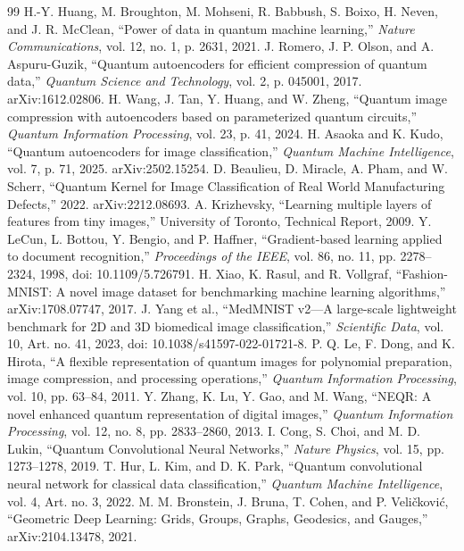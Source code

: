 \documentclass[journal]{IEEEtran}
\begin{document}
\begin{thebibliography}{99}
 H.-Y. Huang, M. Broughton, M. Mohseni, R. Babbush, S. Boixo, H. Neven, and J. R. McClean, ``Power of data in quantum machine learning,'' \textit{Nature Communications}, vol. 12, no. 1, p. 2631, 2021.
 J. Romero, J. P. Olson, and A. Aspuru-Guzik, ``Quantum autoencoders for efficient compression of quantum data,'' \textit{Quantum Science and Technology}, vol. 2, p. 045001, 2017. arXiv:1612.02806.
 H. Wang, J. Tan, Y. Huang, and W. Zheng, ``Quantum image compression with autoencoders based on parameterized quantum circuits,'' \textit{Quantum Information Processing}, vol. 23, p. 41, 2024.
 H. Asaoka and K. Kudo, ``Quantum autoencoders for image classification,'' \textit{Quantum Machine Intelligence}, vol. 7, p. 71, 2025. arXiv:2502.15254.
 D. Beaulieu, D. Miracle, A. Pham, and W. Scherr, ``Quantum Kernel for Image Classification of Real World Manufacturing Defects,'' 2022. arXiv:2212.08693.
 A. Krizhevsky, ``Learning multiple layers of features from tiny images,'' University of Toronto, Technical Report, 2009.
 Y. LeCun, L. Bottou, Y. Bengio, and P. Haffner, ``Gradient-based learning applied to document recognition,'' \textit{Proceedings of the IEEE}, vol. 86, no. 11, pp. 2278--2324, 1998, doi: 10.1109/5.726791.
 H. Xiao, K. Rasul, and R. Vollgraf, ``Fashion-MNIST: A novel image dataset for benchmarking machine learning algorithms,'' arXiv:1708.07747, 2017.
 J. Yang et al., ``MedMNIST v2---A large-scale lightweight benchmark for 2D and 3D biomedical image classification,'' \textit{Scientific Data}, vol. 10, Art. no. 41, 2023, doi: 10.1038/s41597-022-01721-8.
 P. Q. Le, F. Dong, and K. Hirota, ``A flexible representation of quantum images for polynomial preparation, image compression, and processing operations,'' \textit{Quantum Information Processing}, vol. 10, pp. 63--84, 2011.
 Y. Zhang, K. Lu, Y. Gao, and M. Wang, ``NEQR: A novel enhanced quantum representation of digital images,'' \textit{Quantum Information Processing}, vol. 12, no. 8, pp. 2833--2860, 2013.
 I. Cong, S. Choi, and M. D. Lukin, ``Quantum Convolutional Neural Networks,'' \textit{Nature Physics}, vol. 15, pp. 1273--1278, 2019.
 T. Hur, L. Kim, and D. K. Park, ``Quantum convolutional neural network for classical data classification,'' \textit{Quantum Machine Intelligence}, vol. 4, Art. no. 3, 2022.
 M. M. Bronstein, J. Bruna, T. Cohen, and P. Veli\v{c}kovi\'c, ``Geometric Deep Learning: Grids, Groups, Graphs, Geodesics, and Gauges,'' arXiv:2104.13478, 2021.

\end{thebibliography}
\end{document}
